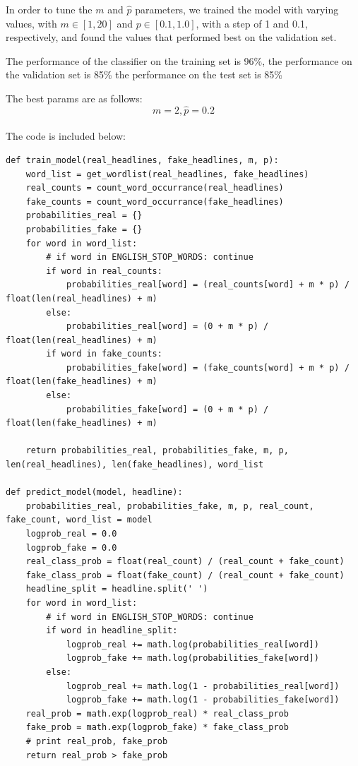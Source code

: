 \documentclass[10pt,letterpaper]{article}
\begin{document}
\begin{enumerate}
		In order to tune the $m$ and $\hat{p}$ parameters, we trained the model with varying values, with $m \in [1, 20]$ and $p\in [0.1, 1.0]$, with a step of 1 and 0.1, respectively, and found the values that performed best on the validation set.

		The performance of the classifier on the training set is 96\%, the performance on the validation set is 85\% the performance on the test set is 85\%

		The best params are as follows: \\
		\[m = 2, \hat{p} = 0.2\]
		\\
		The code is included below:
		\begin{lstlisting}
def train_model(real_headlines, fake_headlines, m, p):
    word_list = get_wordlist(real_headlines, fake_headlines)
    real_counts = count_word_occurrance(real_headlines)
    fake_counts = count_word_occurrance(fake_headlines)
    probabilities_real = {}
    probabilities_fake = {}
    for word in word_list:
        # if word in ENGLISH_STOP_WORDS: continue
        if word in real_counts:
            probabilities_real[word] = (real_counts[word] + m * p) / float(len(real_headlines) + m)
        else:
            probabilities_real[word] = (0 + m * p) / float(len(real_headlines) + m)
        if word in fake_counts:
            probabilities_fake[word] = (fake_counts[word] + m * p) / float(len(fake_headlines) + m)
        else:
            probabilities_fake[word] = (0 + m * p) / float(len(fake_headlines) + m)

    return probabilities_real, probabilities_fake, m, p, len(real_headlines), len(fake_headlines), word_list

def predict_model(model, headline):
    probabilities_real, probabilities_fake, m, p, real_count, fake_count, word_list = model
    logprob_real = 0.0
    logprob_fake = 0.0
    real_class_prob = float(real_count) / (real_count + fake_count)
    fake_class_prob = float(fake_count) / (real_count + fake_count)
    headline_split = headline.split(' ')
    for word in word_list:
        # if word in ENGLISH_STOP_WORDS: continue
        if word in headline_split:
            logprob_real += math.log(probabilities_real[word])
            logprob_fake += math.log(probabilities_fake[word])
        else:
            logprob_real += math.log(1 - probabilities_real[word])
            logprob_fake += math.log(1 - probabilities_fake[word])
    real_prob = math.exp(logprob_real) * real_class_prob
    fake_prob = math.exp(logprob_fake) * fake_class_prob
    # print real_prob, fake_prob
    return real_prob > fake_prob


\end{lstlisting}
\end{enumerate}
\end{document}
